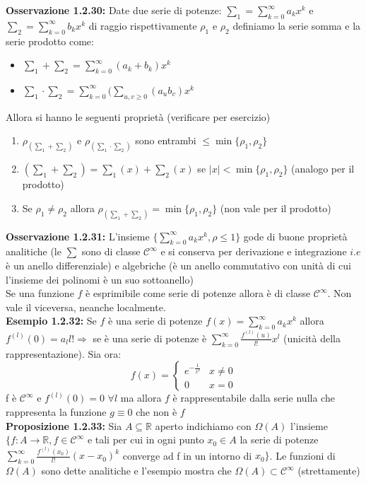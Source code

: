 \documentclass[a4paper,11pt,titlepage]{book}
\begin{document}
\textbf{Osservazione 1.2.30:} Date due serie di potenze: $\sum_1=\sum_{k=0}^\infty a_k x^k$ e  $\sum_2=\sum_{k=0}^\infty b_k x^k$ di raggio rispettivamente $\rho_1$ e $\rho_2$ definiamo la serie somma e la serie prodotto come: \begin{itemize}
\item $\sum_1+\sum_2=\sum_{k=0}^\infty (a_k+b_k)x^k$
\item $\sum_1\cdot\sum_2=\sum_{k=0}^\infty(\sum\limits_{u,v\geq 0}(a_u b_v)x^k$
\end{itemize} Allora si hanno le seguenti proprietà (verificare per esercizio)\begin{enumerate}
\item $\rho_{(\sum_1+\sum_2)}$ e $\rho_{(\sum_1\cdot\sum_2)}$ sono entrambi $\leq\min\{\rho_1,\rho_2\}$
\item $(\sum_1+\sum_2)=\sum_1(x)+\sum_2(x)$ se $|x|<\min\{\rho_1,\rho_2\}$ (analogo per il prodotto)
\item Se $\rho_1\neq\rho_2$ allora $\rho_{(\sum_1+\sum_2)}=\min\{\rho_1,\rho_2\}$ (non vale per il prodotto)\\
\end{enumerate}

\textbf{Osservazione 1.2.31:} L'insieme $\{\sum_{k=0}^\infty a_k x^k, \rho\leq 1\}$ gode di buone proprietà analitiche (le $\sum$ sono di classe $\mathcal{C}^\infty$ e si conserva per derivazione e integrazione $i.e$ è un anello differenziale) e algebriche (è un anello commutativo con unità di cui l'insieme dei polinomi è un suo sottoanello) \\

Se una funzione $f$ è esprimibile come serie di potenze allora è di classe  $\mathcal{C}^\infty$. Non vale il viceversa, neanche localmente.\\

\textbf{Esempio 1.2.32:} Se $f$ è una serie di potenze $f(x)=\sum_{k=0}^\infty a_k x^k$ allora $f^{(l)}(0)=a_l l!\Rightarrow$ se è una serie di potenze è $\sum_{k=0}^\infty \frac{f^{(l)}(u)}{l!}x^l$ (unicità della rappresentazione). Sia ora: $$f(x)=
\begin{cases}
 e^{-\frac{1}{x^2}} &  x\ne 0 \\ 
0 & x=0
\end{cases}$$  f è $\mathcal{C}^\infty$ e $f^{(l)}(0)=0$ $\forall l$ ma allora $f$ è rappresentabile dalla serie nulla che rappresenta la funzione $g\equiv 0$ che non è $f$\\

\textbf{Proposizione 1.2.33:} Sia $A\subseteq\mathbb{R}$ aperto indichiamo con $\Omega(A)$ l'insieme $\{f:A\to\mathbb{R}, f\in\mathcal{C}^\infty$ e tali per cui in ogni punto $x_0\in A$ la serie di potenze $\sum_{k=0}^\infty \frac{f^{(l)}(x_0)}{l!}(x-x_0)^k$ converge ad f in un intorno di $x_0\}$. Le funzioni di $\Omega(A)$ sono dette analitiche e l'esempio mostra che $\Omega(A)\subset\mathcal{C}^\infty$ (strettamente)
\end{document}
